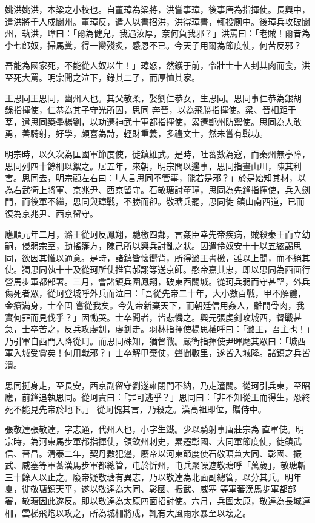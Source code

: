 \begin{pinyinscope}
 姚洪姚洪，本梁之小校也。自董璋為梁將，洪嘗事璋，後事唐為指揮使。長興中，遣洪將千人戍閬州。董璋反，遣人以書招洪，洪得璋書，輒投廁中。後璋兵攻破閬州，執洪，璋曰：「爾為健兒，我遇汝厚，奈何負我邪？」洪罵曰：「老賊！爾昔為李七郎奴，掃馬糞，得一臠殘炙，感恩不已。今天子用爾為節度使，何苦反邪？



 吾能為國家死，不能從人奴以生！」璋怒，然鑊于前，令壯士十人刲其肉而食，洪至死大罵。明宗聞之泣下，錄其二子，而厚恤其家。



 王思同王思同，幽州人也。其父敬柔，娶劉仁恭女，生思同。思同事仁恭為銀胡錄指揮使，仁恭為其子守光所囚，思同
 奔晉，以為飛勝指揮使。梁、晉相距于莘，遣思同築壘楊劉，以功遷神武十軍都指揮使，累遷鄭州防禦使。思同為人敢勇，善騎射，好學，頗喜為詩，輕財重義，多禮文士，然未嘗有戰功。



 明宗時，以久次為匡國軍節度使，徙鎮雄武。是時，吐蕃數為寇，而秦州無亭障，思同列四十餘柵以禦之。居五年，來朝，明宗問以邊事，思同指畫山川，陳其利害。思同去，明宗顧左右曰：「人言思同不管事，能若是邪？」於是始知其材，以為右武衛上將軍、京兆尹、西京留守。石敬瑭討董璋，思同為先鋒指揮使，兵入劍門，而後軍不繼，思同與璋戰，不勝而卻。敬瑭兵罷，思同徙
 鎮山南西道，已而復為京兆尹、西京留守。



 應順元年二月，潞王從珂反鳳翔，馳檄四鄰，言姦臣幸先帝疾病，賊殺秦王而立幼嗣，侵弱宗室，動搖籓方，陳己所以興兵討亂之狀。因遣伶奴安十十以五絃謁思同，欲因其懽以通意。是時，諸鎮皆懷嚮背，所得潞王書檄，雖以上聞，而不絕其使。獨思同執十十及從珂所使推官郝詡等送京師。愍帝嘉其忠，即以思同為西面行營馬步軍都部署。三月，會諸鎮兵圍鳳翔，破東西關城。從珂兵弱而守甚堅，外兵傷死者眾，從珂登城呼外兵而泣曰：「吾從先帝二十年，大小數百戰，甲不解體，金瘡滿身，士卒固
 嘗從我矣。今先帝新棄天下，而朝廷信用姦人，離間骨肉，我實何罪而見伐乎？」因慟哭。士卒聞者，皆悲憐之。興元張虔釗攻城西，督戰甚急，士卒苦之，反兵攻虔釗，虔釗走。羽林指揮使楊思權呼曰：「潞王，吾主也！」乃引軍自西門入降從珂。而思同硃知，猶督戰。嚴衛指揮使尹暉麾其眾曰：「城西軍入城受賞矣！何用戰邪？」士卒解甲棄仗，聲聞數里，遂皆入城降。諸鎮之兵皆潰。



 思同挺身走，至長安，西京副留守劉遂雍閉門不納，乃走潼關。從珂引兵東，至昭應，前鋒追執思同。從珂責曰：「罪可逃乎？」思同曰：「非不知從王而得生，恐終死不能見先帝於地下。」
 從珂愧其言，乃殺之。漢高祖即位，贈侍中。



 張敬達張敬達，字志通，代州人也，小字生鐵。少以騎射事唐莊宗為直軍使。明宗時，為河東馬步軍都指揮使，領欽州刺史，累遷彰國、大同軍節度使，徙鎮武信、晉昌。清泰二年，契丹數犯邊，廢帝以河東節度使石敬瑭兼大同、彰國、振武、威塞等軍蕃漢馬步軍都總管，屯於忻州，屯兵聚噪遮敬瑭呼「萬歲」，敬瑭斬三十餘人以止之。廢帝疑敬瑭有異志，乃以敬達為北面副總管，以分其兵。明年夏，徙敬瑭鎮天平，遂以敬達為大同、彰國、振武、威塞
 等軍蕃漢馬步軍都部署，敬瑭因此遂反。即以敬達為太原四面招討使。六月，兵圍太原，敬達為長城連柵，雲梯飛炮以攻之，所為城柵將成，輒有大風雨水暴至以壞之。




\end{pinyinscope}
